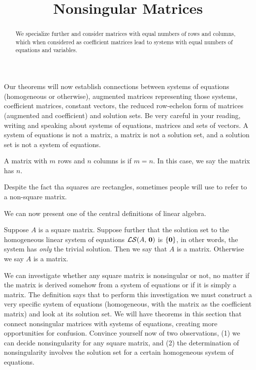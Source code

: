 \documentclass{ximera}
\title{Nonsingular Matrices}
\begin{document}
\begin{abstract}
  We specialize further and consider matrices with equal numbers of
  rows and columns, which when considered as coefficient matrices lead
  to systems with equal numbers of equations and variables.
\end{abstract}
\maketitle

Our theorems will now establish connections between systems of
equations (homogeneous or otherwise), augmented matrices representing
those systems, coefficient matrices, constant vectors, the reduced
row-echelon form of matrices (augmented and coefficient) and solution
sets.  Be very careful in your reading, writing and speaking about
systems of equations, matrices and sets of vectors.  A system of
equations is not a matrix, a matrix is not a solution set, and a
solution set is not a system of equations.

\begin{definition}
  A matrix with $m$ rows and $n$ columns is  if $m=n$.  In
  this case, we say the matrix has  $n$.
\end{definition}

\begin{warning}
  Despite the fact tha squares are rectangles, sometimes people will
  use  to refer to a non-square matrix.
\end{warning}

We can now present one of the central definitions of linear algebra.

\begin{definition}
  Suppose $A$ is a square matrix.  Suppose further that the solution
  set to the homogeneous linear system of equations
  $\mathcal{LS}\!\left(A,\,\mathbf{0}\right)$ is $\left\{\mathbf{0}\right\}$, in other
  words, the system has \textit{only} the trivial solution.  Then we
  say that $A$ is a  matrix.  Otherwise we say $A$ is
  a  matrix.
\end{definition}

We can investigate whether any square matrix is nonsingular or not, no
matter if the matrix is derived somehow from a system of equations or
if it is simply a matrix.  The definition says that to perform this
investigation we must construct a very specific system of equations
(homogeneous, with the matrix as the coefficient matrix) and look at
its solution set.  We will have theorems in this section that connect
nonsingular matrices with systems of equations, creating more
opportunities for confusion.  Convince yourself now of two
observations, (1) we can decide nonsingularity for any square matrix,
and (2) the determination of nonsingularity involves the solution set
for a certain homogeneous system of equations.
\end{document}
